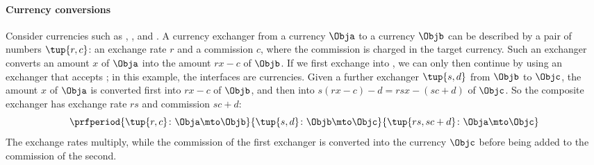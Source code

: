 \paragraph{Currency conversions}
Consider currencies such as \CHF, \EUR, and \USD. A currency exchanger from a currency $\Obja$ to a currency $\Objb$ can be described by a pair of numbers $\tup{r,c}$: an exchange rate $r$ and a commission $c$, where the commission is charged in the target currency. Such an exchanger converts an amount $x$ of $\Obja$ into the amount $rx - c$ of $\Objb$. If we first exchange \CHF into \EUR, we can only then continue by using an exchanger that accepts \EUR; in this example, the interfaces are currencies. Given a further exchanger $\tup{s,d}$ from $\Objb$ to $\Objc$, the amount $x$ of $\Obja$ is converted first into $rx - c$ of $\Objb$, and then into $s(rx - c) - d = rsx - (sc + d)$ of $\Objc$. So the composite exchanger has exchange rate $rs$ and commission $sc + d$:
\begin{equation}
    \label{eq:interfaces-currencies}
    \prfperiod{
        \tup{r,c} \colon \Obja \mto \Objb
    }{
        \tup{s,d} \colon \Objb \mto \Objc
    }{
        \tup{rs, sc+d} \colon \Obja \mto \Objc
    }
\end{equation}
The exchange rates multiply, while the commission of the first exchanger is converted into the currency $\Objc$ before being added to the commission of the second.






